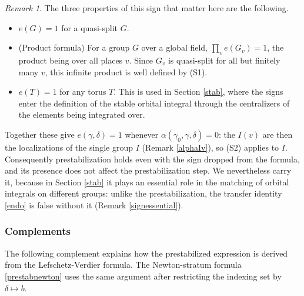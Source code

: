 \documentclass[11pt,a4paper]{article}
\theoremstyle{definition}
\theoremstyle{plain}
\theoremstyle{remark}
\newtheorem{R}[shared]{Remark}
\theoremstyle{plain}
\begin{document}
\begin{R}\label{sign}
    The three properties of this sign that matter here are the following.
    \begin{itemize}
        \item[(S1)] $e(G) = 1$ for a quasi-split $G$.
        \item[(S2)] (Product formula) For a group $G$ over a global field, $\prod_v e(G_v) = 1$, the product being over all places $v$. Since $G_v$ is quasi-split for all but finitely many $v$, this infinite product is well defined by (S1).
        \item[(S3)] $e(T) = 1$ for any torus $T$. This is used in Section \ref{stab}, where the signs enter the definition of the stable orbital integral through the centralizers of the elements being integrated over.
    \end{itemize}
    Together these give $e(\gamma,\delta) = 1$ whenever $\alpha(\gamma_0, \gamma, \delta) = 0$: the $I(v)$ are then the localizations of the single group $I$ (Remark \ref{alphaIv}), so (S2) applies to $I$. Consequently prestabilization holds even with the sign dropped from the formula, and its presence does not affect the prestabilization step. We nevertheless carry it, because in Section \ref{stab} it plays an essential role in the matching of orbital integrals on different groups: unlike the prestabilization, the transfer identity \eqref{endo} is false without it (Remark \ref{signessential}).
\end{R}

\subsubsection*{Complements}

The following complement explains how the prestabilized expression is derived from the Lefschetz-Verdier formula. The Newton-stratum formula \eqref{prestabnewton} uses the same argument after restricting the indexing set by $\delta \mapsto b$.
\end{document}

